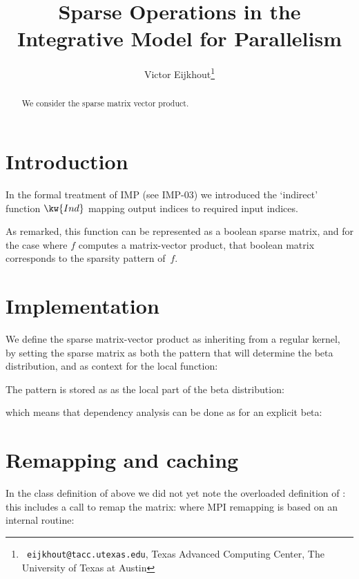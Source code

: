 \documentclass[11pt,fleqn,preprint]{impreport}
\title[Sparse operations in IMP]{Sparse Operations in the Integrative Model for Parallelism}
\author[Eijkhout]{Victor Eijkhout\thanks{{\tt
      eijkhout@tacc.utexas.edu}, Texas Advanced Computing Center, The
    University of Texas at Austin}}
\begin{document}
\maketitle

\begin{abstract}
We consider the sparse matrix vector product.
\end{abstract}

\section{Introduction}

In the formal treatment of \acf{IMP} (see IMP-03) we introduced the `indirect'
function $\kw{Ind}$ mapping output indices to required input indices.


As remarked, this function can be represented as a boolean sparse matrix,
and for the case where $f$ computes a matrix-vector product,
that boolean matrix corresponds to the sparsity pattern of~$f$.

\section{Implementation}

We define the sparse matrix-vector product as inheriting from a regular kernel,
by setting the sparse matrix as both the pattern that will determine the beta
distribution, and as context for the local function:

The pattern is stored as as the local part of the beta distribution:

which means that dependency analysis can be done as for an explicit beta:

\section{Remapping and caching}

In the class definition of  above we did not yet
note the overloaded definition of :
this includes a call to remap the matrix:
%
%
where MPI remapping is based on an internal routine:
%


%
%
\end{document}
